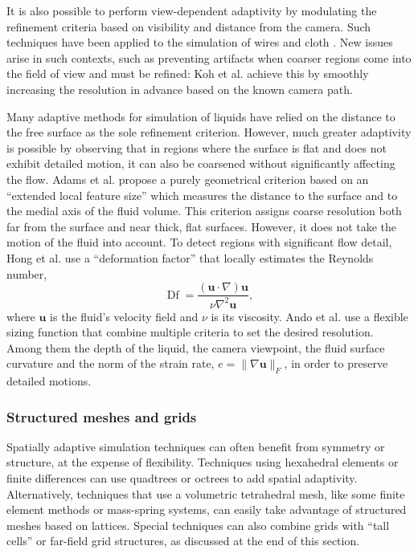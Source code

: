 It is also possible to perform view-dependent adaptivity by modulating the refinement criteria based on visibility and distance from the camera. Such techniques have been applied to the simulation of wires \cite{Servin2008} and cloth \cite{Koh2014}. New issues arise in such contexts, such as preventing artifacts when coarser regions come into the field of view and must be refined: Koh et al. \cite{Koh2014} achieve this by smoothly increasing the resolution in advance based on the known camera path.

Many adaptive methods for simulation of liquids have relied on the distance to the free surface as the sole refinement criterion.
However, much greater adaptivity is possible by observing that in regions where the surface is flat and does not exhibit detailed motion, it can also be coarsened without significantly affecting the flow.
Adams et al. \cite{Adams2007} propose a purely geometrical criterion based on an ``extended local feature size'' which measures the distance to the surface and to the medial axis of the fluid volume.
This criterion assigns coarse resolution both far from the surface and near thick, flat surfaces.
However, it does not take the motion of the fluid into account.
To detect regions with significant flow detail, Hong et al. \cite{Hong2008FLIP} use a ``deformation factor'' that locally estimates the Reynolds number,
\begin{equation}
  \operatorname{Df} = \frac{(\mathbf u\cdot\nabla)\mathbf u}{\nu\nabla^2\mathbf u},
\end{equation}
where $\mathbf u$ is the fluid's velocity field and $\nu$ is its viscosity.
Ando et al. \cite{Ando2013} use a flexible sizing function that combine multiple criteria to set the desired resolution. Among them the depth of the liquid, the camera viewpoint, the fluid surface curvature and the norm of the strain rate, $e = \|\nabla\mathbf u\|_F$, in order to preserve detailed motions.

\subsubsection{Structured meshes and grids}

\label{sec:structured}
Spatially adaptive simulation techniques can often benefit from symmetry or structure, at the expense of flexibility. Techniques using hexahedral elements or finite differences can use quadtrees or octrees to add spatial adaptivity. Alternatively, techniques that use a volumetric tetrahedral mesh, like some finite element methods or mass-spring systems, can easily take advantage of structured meshes based on lattices. Special techniques can also combine grids with ``tall cells'' or far-field grid structures, as discussed at the end of this section.

